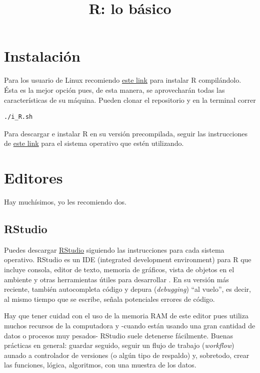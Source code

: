 \documentclass[]{article}
\title{R: lo básico}
\author{}
\date{}
\begin{document}
\section{Instalación}\label{instalacion}

Para los usuario de Linux recomiendo
\href{https://github.com/Skalas/massive-adventure-ubuntu/blob/master/i_R.sh}{este
link} para instalar R compilándolo. Ésta es la mejor opción pues, de
esta manera, se aprovecharán todas las características de su máquina.
Pueden clonar el repositorio y en la terminal correr

\begin{verbatim}
./i_R.sh
\end{verbatim}

Para descargar e instalar R en su versión precompilada, seguir las
instrucciones de \href{https://cran.r-project.org/}{este link} para el
sistema operativo que estén utilizando.

\section{Editores}\label{editores}

Hay muchísimos, yo les recomiendo dos.

\subsection{RStudio}\label{rstudio}

Puedes descargar
\href{https://www.rstudio.com/products/rstudio/download/}{RStudio}
siguiendo las instrucciones para cada sistema operativo. RStudio es un
IDE (integrated development environment) para R que incluye consola,
editor de texto, memoria de gráficos, vista de objetos en el ambiente y
otras herramientas útiles para desarrollar \parencite{rstudio}. En su
versión más reciente, también autocompleta código y depura
(\emph{debugging}) ``al vuelo'', es decir, al mismo tiempo que se
escribe, señala potenciales errores de código.

Hay que tener cuidad con el uso de la memoria RAM de este editor pues
utiliza muchos recursos de la computadora y -cuando están usando una
gran cantidad de datos o procesos muy pesados- RStudio suele detenerse
fácilmente. Buenas prácticas en general: guardar seguido, seguir un
flujo de trabajo (\emph{workflow}) aunado a controlador de versiones (o
algún tipo de respaldo) y, sobretodo, crear las funciones, lógica,
algoritmos, con una muestra de los datos.
\end{document}
